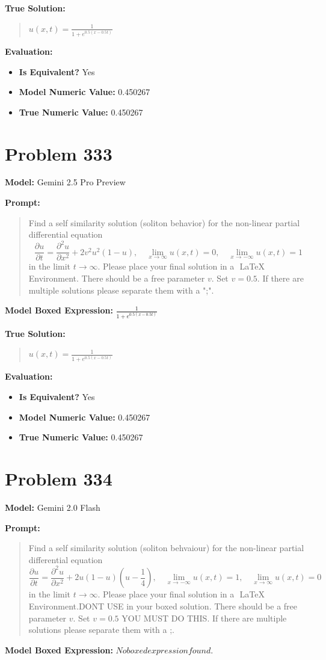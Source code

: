 \documentclass{article}
\begin{document}
{\textbf{True Solution:}
\begin{quote}
$u(x, t) = \frac{1}{1 + e^{0.5(x - 0.5 t)}}$
\end{quote}

\textbf{Evaluation:}
\begin{itemize}
\item \textbf{Is Equivalent?} Yes
\item \textbf{Model Numeric Value:} 0.450267
\item \textbf{True Numeric Value:} 0.450267
\end{itemize}
\vspace{1cm}
\section*{Problem 333}
\textbf{Model:} Gemini 2.5 Pro Preview

\textbf{Prompt:}
\begin{quote}
Find a self similarity solution (soliton behavior) for the non-linear partial differential equation $$\frac{\partial u}{\partial t} = \frac{\partial^2 u}{\partial x^2} + 2v^2 u^2 (1 - u), \quad \lim_{x \to \infty} u(x, t) = 0, \quad \lim_{x \to -\infty} u(x, t) = 1$$ in the limit $t \rightarrow \infty$. Please place your final solution in a $\boxed{}$ LaTeX Environment. There should be a free parameter $v$. Set $v=0.5$. If there are multiple solutions please separate them with a ";".
\end{quote}
\textbf{Model Boxed Expression:} $\frac{1}{1+e^{0.5(x-0.5t)}}$

\textbf{True Solution:}
\begin{quote}
$u(x, t) = \frac{1}{1 + e^{0.5(x - 0.5 t)}}$
\end{quote}

\textbf{Evaluation:}
\begin{itemize}
\item \textbf{Is Equivalent?} Yes
\item \textbf{Model Numeric Value:} 0.450267
\item \textbf{True Numeric Value:} 0.450267
\end{itemize}
\vspace{1cm}
\section*{Problem 334}
\textbf{Model:} Gemini 2.0 Flash

\textbf{Prompt:}
\begin{quote}
Find a self similarity solution (soliton behvaiour) for the non-linear partial differential equation $$ \frac{\partial u}{\partial t} = \frac{\partial^2 u}{\partial x^2} + 2 u(1-u)(u-\frac{1}{4}), \quad \lim_{x \to -\infty} u(x,t) = 1, \quad \lim_{x \to \infty} u(x,t) = 0 $$ in the limit $t \rightarrow \infty $. Please place your final solution in a $\boxed{}$ LaTeX Environment.DONT USE \operatorname in your boxed solution. There should be a free parameter $v$. Set $v=0.5$ YOU MUST DO THIS. If there are multiple solutions please separate them with a ;.
\end{quote}
\textbf{Model Boxed Expression:} $No boxed expression found.$

}
\end{document}
